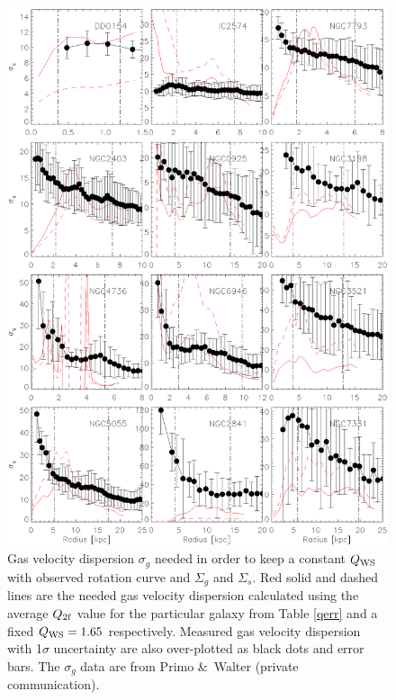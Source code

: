 \documentclass[12pt,preprint]{aastex}
\begin{document}
\begin{figure}[htbp]
\begin{center}
\includegraphics[scale=0.7]{vsigma_g2.eps}  \caption{Gas velocity dispersion $\sigma_g$  needed in order to keep a constant $Q_{\rm WS}$ with observed rotation curve and $\Sigma_g$ and $\Sigma_s$. Red solid and dashed lines are the needed gas velocity dispersion calculated using the average $Q_{\rm 2f}$ value for the particular galaxy from Table \ref{qerr} and a fixed $Q_{\rm WS}=1.65$ respectively. 
Measured gas velocity dispersion with 1$\sigma$ uncertainty are also over-plotted as black dots and error bars. The $\sigma_g$ data are from Primo \&\ Walter (private communication). }
\label{fig_vsig}
\end{center}
\end{figure}
\end{document}
